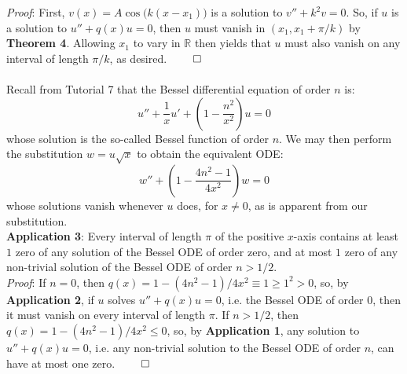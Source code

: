 \documentclass[12pt]{article}
\newcommand{\reals}{\mathbb{R}}
\begin{document}
\noindent \textit{Proof}: First, $v(x) = A \cos \big( k (x - x_1) \big)$ is a solution to $v'' + k^2v = 0$. So, if $u$ is a solution to $u'' + q(x)u = 0$, then $u$ must vanish in $(x_1, x_1 + \pi/k)$ by \textbf{Theorem 4}. Allowing $x_1$ to vary in $\reals$ then yields that $u$ must also vanish on any interval of length $\pi/k$, as desired. $\qed$ \\ \\

\noindent Recall from Tutorial 7 that the Bessel differential equation of order $n$ is: $$u'' + \dfrac{1}{x}u' + \left(1 - \dfrac{n^2}{x^2} \right)u = 0$$ whose solution is the so-called Bessel function of order $n$. We may then perform the substitution $w = u\sqrt{x}$ to obtain the equivalent ODE: $$w'' + \left( 1 - \dfrac{4n^2 - 1}{4x^2} \right)w = 0$$ whose solutions vanish whenever $u$ does, for $x \not= 0$, as is apparent from our substitution. \\

\noindent \textbf{Application 3}: Every interval of length $\pi$ of the positive $x$-axis contains at least $1$ zero of any solution of the Bessel ODE of order zero, and at most $1$ zero of any non-trivial solution of the Bessel ODE of order $n > 1/2$. \\

\noindent \textit{Proof}: If $n = 0$, then $q(x) = 1- (4n^2 - 1)/4x^2 \equiv 1 \geq 1^2 > 0$, so, by \textbf{Application 2}, if $u$ solves $u'' + q(x) u = 0$, i.e. the Bessel ODE of order $0$, then it must vanish on every interval of length $\pi$. If $n > 1/2$, then $q(x) = 1 - (4n^2 - 1)/4x^2 \leq 0$, so, by \textbf{Application 1}, any solution to $u'' + q(x)u = 0$, i.e. any non-trivial solution to the Bessel ODE of order $n$, can have at most one zero. $\qed$
\end{document}
